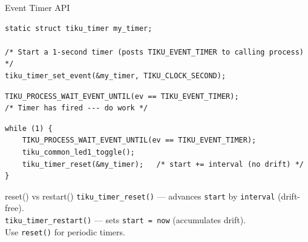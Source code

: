 \documentclass[aspectratio=169, 10pt]{beamer}
\begin{document}
\begin{frame}[fragile]{Event Timer API}
\begin{lstlisting}[style=cstyle, title={Set an event timer}]
static struct tiku_timer my_timer;

/* Start a 1-second timer (posts TIKU_EVENT_TIMER to calling process) */
tiku_timer_set_event(&my_timer, TIKU_CLOCK_SECOND);
\end{lstlisting}

\begin{lstlisting}[style=cstyle, title={Wait for the timer event}]
TIKU_PROCESS_WAIT_EVENT_UNTIL(ev == TIKU_EVENT_TIMER);
/* Timer has fired --- do work */
\end{lstlisting}

\begin{lstlisting}[style=cstyle, title={Periodic: drift-free reset}]
while (1) {
    TIKU_PROCESS_WAIT_EVENT_UNTIL(ev == TIKU_EVENT_TIMER);
    tiku_common_led1_toggle();
    tiku_timer_reset(&my_timer);   /* start += interval (no drift) */
}
\end{lstlisting}

\begin{alertblock}{reset() vs restart()}
\texttt{tiku\_timer\_reset()} --- advances \texttt{start} by \texttt{interval} (drift-free).\\
\texttt{tiku\_timer\_restart()} --- sets \texttt{start = now} (accumulates drift).\\
Use \texttt{reset()} for periodic timers.
\end{alertblock}
\end{frame}
\end{document}
